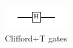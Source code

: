 \begin{figure}
\includegraphics[scale=2]{Figures/H}
\caption{Clifford+T gates}
\label{fig:clifford}
\end{figure}